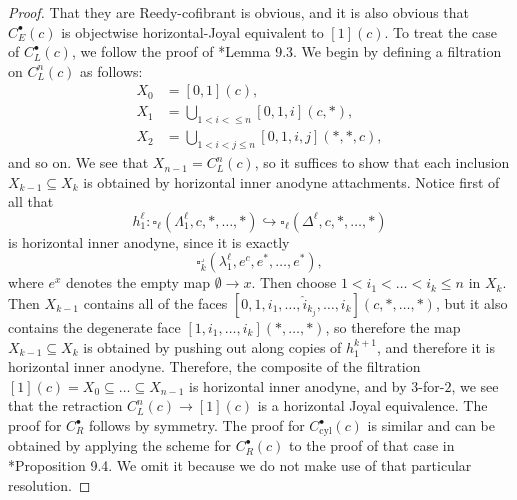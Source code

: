 \documentclass[leqno]{article}
\numberwithin{equation}{subsection}
\theoremstyle{plain}   %
\newtheorem{cor}[equation]{Corollary}
\theoremstyle{remark}
\theoremstyle{plain}
\newcommand{\cellset}{\ensuremath{\widehat{\Theta[\mathcal{C}]}}}
\begin{document}
\begin{proof}
	That they are Reedy-cofibrant is obvious, and it is also obvious that \(C^\bullet_E(c)\) is objectwise horizontal-Joyal equivalent to \([1](c)\). 	To treat the case of \(C^\bullet_L(c)\), we follow the proof of \cite{ds2}*{Lemma 9.3}. We begin by defining a filtration on \(C^n_L(c)\) as follows: 
	\begin{align*}
		X_0 &= [0,1](c), \\
		X_1 &= \bigcup_{1< i <\leq n} [0,1,i](c,\ast), \\
		X_2 &= \bigcup_{1< i < j \leq n} [0,1,i,j](\ast,\ast,c),  
	\end{align*}
	and so on.  We see that \(X_{n-1}=C^n_L(c)\), so it suffices to show that each inclusion \(X_{k-1} \subseteq X_{k}\) is obtained by horizontal inner anodyne attachments.  Notice first of all that 
	\[h^\ell_1:\square_\ell(\Lambda^\ell_1,c,\ast,\dots,\ast)\hookrightarrow \square_\ell(\Delta^\ell,c,\ast,\dots,\ast)\] is horizontal inner anodyne, since it is exactly \[\square^\lrcorner_k(\lambda^\ell_1,e^{c},e^\ast,\dots,e^\ast),\] where \(e^x\) denotes the empty map \(\emptyset \to x\).
	Then choose \(1< i_1 < \dots < i_k \leq n\) in \(X_k\).  Then \(X_{k-1}\) contains all of the faces \([0,1,i_1,\dots, \hat{i}_{k_j},\dots,i_k](c,\ast,\dots,\ast)\), but it also contains the degenerate face \([1,i_1,\dots,i_k](\ast,\dots,\ast)\), so therefore the map \(X_{k-1} \subseteq X_k\) is obtained by pushing out along copies of \(h^{k+1}_1\), and therefore it is horizontal inner anodyne.  Therefore, the composite of the filtration \([1](c)=X_0 \subseteq \dots \subseteq X_{n-1}\) is horizontal inner anodyne, and by \(3\)-for-\(2\), we see that the retraction \(C^n_L(c) \to [1](c)\) is a horizontal Joyal equivalence.  The proof for \(C^\bullet_R\) follows by symmetry. 
	The proof for \(C^\bullet_{\mathrm{cyl}}(c)\) is similar and can be obtained by applying the scheme for \(C^\bullet_R(c)\) to the proof of that case in \cite{ds2}*{Proposition 9.4}. We omit it because we do not make use of that particular resolution.
\end{proof}
\begin{comment}
	\begin{cor}
		Each of the functors \(C^n_\mathrm{cyl}(\bullet), C^n_R(\bullet), C^n_L(\bullet), C^n_E(\bullet)\) defines a rank-\(1\) 	gadget for each \(n\geq 0\).
	\end{cor}
	\begin{proof}
		Since \(\mathfrak{C}\) is left-Quillen, it preserves weak equivalences between cofibrant objects in \(\cellset\).  It 	follows that since for each \(n\geq 0\) we have that \(C^n_{-}(\bullet)\to [1](\bullet)\) is a weak equivalence, then
		\[\mathfrak{C}(C^n_{-}(\bullet))(\alpha,\omega) \to \mathfrak{C}([1](\bullet))(\alpha,\omega)=\bullet\]
		is a weak equivalence, so we have the natural zig-zag we require.
	\end{proof}
\end{comment}
\end{document}
